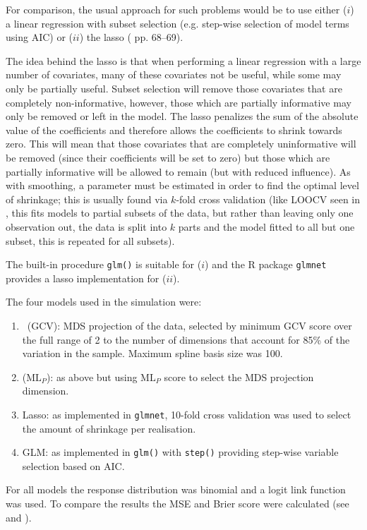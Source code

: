 For comparison, the usual approach for such problems would be to use either ($i$) a linear regression with subset selection (e.g. step-wise selection of model terms using AIC) or ($ii$) the lasso (\cite{elements} pp. 68--69). 

The idea behind the lasso is that when performing a linear regression with a large number of covariates, many of these covariates not be useful, while some may only be partially useful. Subset selection will remove those covariates that are completely non-informative, however, those which are partially informative may only be removed or left in the model. The lasso penalizes the sum of the absolute value of the coefficients and therefore allows the coefficients to shrink towards zero. This will mean that those covariates that are completely uninformative will be removed (since their coefficients will be set to zero) but those which are partially informative will be allowed to remain (but with reduced influence). As with smoothing, a parameter must be estimated in order to find the optimal level of shrinkage; this is usually found via $k$-fold cross validation (like LOOCV seen in , this fits models to partial subsets of the data, but rather than leaving only one observation out, the data is split into $k$ parts and the model fitted to all but one subset, this is repeated for all subsets). 

The built-in procedure \texttt{glm()} is suitable for ($i$) and the \textsf{R} package \texttt{glmnet} provides a lasso implementation for ($ii$).

The four models used in the simulation were:
\begin{enumerate}
	\item \mdsds\ (GCV): MDS projection of the data, selected by minimum GCV score over the full range of 2 to the number of dimensions that account for 85\% of the variation in the sample. Maximum spline basis size was 100.
	\item \mdsds\: ($\text{ML}_P$): as above but using $\text{ML}_P$ score to select the MDS projection dimension.
	\item Lasso: as implemented in \texttt{glmnet}, 10-fold cross validation was used to select the amount of shrinkage per realisation.
	\item GLM: as implemented in \texttt{glm()} with \texttt{step()} providing step-wise variable selection based on AIC.
\end{enumerate}
For all models the response distribution was binomial and a logit link function was used. To compare the results the MSE and Brier score were calculated (see  and ).


